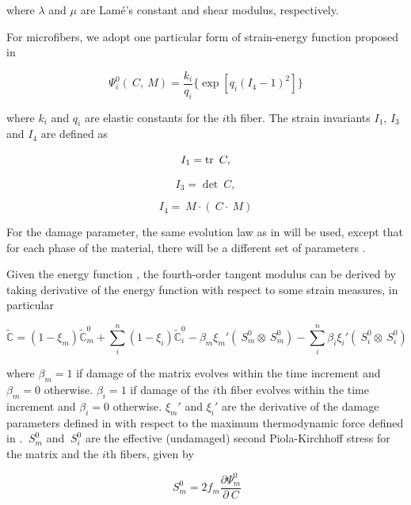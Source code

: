 \documentclass[12pt]{article}
\numberwithin{equation}{section}
\begin{document}
where $\lambda$ and $\mu$ are Lam\'{e}'s constant and shear modulus,
respectively.

For microfibers, we adopt one particular form of strain-energy
function proposed in \cite{Holzapfel.etal:2010}

\begin{equation}
  \Psi_i^0(~C, ~M)
    = \frac{k_i}{q_i}
    \{ \exp[q_i(I_4 - 1)^2] \}
\end{equation}

where $k_i$ and $q_i$ are elastic constants for the $i$th fiber.
The strain invariants $I_1$, $I_3$ and $I_4$ are defined as

\begin{equation}
  I_1 = \operatorname{\text{tr}} ~C,
\end{equation}

\begin{equation}
  I_3 = \det ~C,
\end{equation}

\begin{equation}
  I_4 = ~M \cdot (~C \cdot ~M)
\end{equation}

For the damage parameter, the same evolution law as in
 will be used, except that for each phase of the
material, there will be a different set of parameters \cite{Chen.etal:2014}.

Given the energy function , the fourth-order
tangent modulus can be derived by taking derivative of the energy
function with respect to some strain measures, in particular

\begin{equation}\label{eq:aniso_tangent}
  \tilde{\mathbb{C}}
   = (1-\xi_m) \tilde{\mathbb{C}}_m^0
   + \sum_i^n (1-\xi_i) \tilde{\mathbb{C}}_i^0
   -\beta_m \xi_m'  (~S_m^0 \otimes ~S_m^0 )
   - \sum_i^n \beta_i \xi_i' (~S_i^0 \otimes ~S_i^0 )
\end{equation}

where $\beta_m = 1$ if damage of the matrix evolves within the
time increment and $\beta_m=0$ otherwise. $\beta_i = 1$ if damage of
the $i$th fiber evolves within the time increment and $\beta_i=0$
otherwise. $\xi_m'$ and $\xi_i'$ are the derivative of the damage
parameters defined in  with respect to the maximum
thermodynamic force defined in . $~S_m^0$ and
$~S_i^0$ are the effective (undamaged) second Piola-Kirchhoff stress for the matrix and the $i$th fibers, given by

\begin{equation}\label{eq:aniso_S0m}
  ~S_m^0 =
    2 f_m \frac{\partial \Psi_m^0}{\partial~C}
\end{equation}
\end{document}
